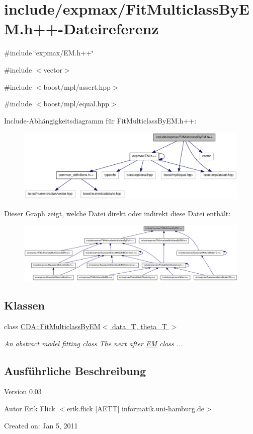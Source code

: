 \hypertarget{FitMulticlassByEM_8h_09_09}{
\section{include/expmax/FitMulticlassByEM.h++-\/Dateireferenz}
\label{FitMulticlassByEM_8h_09_09}
}
{\ttfamily \#include \char`\"{}expmax/EM.h++\char`\"{}}\par
{\ttfamily \#include $<$vector$>$}\par
{\ttfamily \#include $<$boost/mpl/assert.hpp$>$}\par
{\ttfamily \#include $<$boost/mpl/equal.hpp$>$}\par
Include-\/Abhängigkeitsdiagramm für FitMulticlassByEM.h++:\nopagebreak
\begin{figure}[H]
\begin{center}
\leavevmode
\includegraphics[width=345pt]{FitMulticlassByEM_8h_09_09__incl}
\end{center}
\end{figure}
Dieser Graph zeigt, welche Datei direkt oder indirekt diese Datei enthält:\nopagebreak
\begin{figure}[H]
\begin{center}
\leavevmode
\includegraphics[width=420pt]{FitMulticlassByEM_8h_09_09__dep__incl}
\end{center}
\end{figure}
\subsection*{Klassen}
\begin{DoxyCompactItemize}
\item 
class \hyperlink{classCDA_1_1FitMulticlassByEM}{CDA::FitMulticlassByEM$<$ data\_\-T, theta\_\-T $>$}
\begin{DoxyCompactList}\small\item\em An abstract model fitting class The next after \hyperlink{classCDA_1_1EM}{EM} class ... \item\end{DoxyCompactList}\end{DoxyCompactItemize}


\subsection{Ausführliche Beschreibung}
\begin{DoxyVersion}{Version}
0.03
\end{DoxyVersion}
\begin{DoxyAuthor}{Autor}
Erik Flick $<$erik.flick \mbox{[}AETT\mbox{]} informatik.uni-\/hamburg.de$>$
\end{DoxyAuthor}
Created on: Jan 5, 2011 